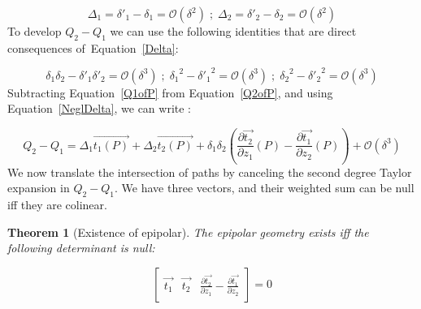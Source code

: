 \documentclass{ipol}
\newcommand{\BigV}[1]{\ensuremath{\overrightarrow{#1}}}
\newcommand{\TanO}[1]{\BigV{t_1#1}}
\newcommand{\TanT}[1]{\BigV{t_2#1}}
\newcommand{\Negl}[1]{\ensuremath{\mathcal{O}(#1)}}
\newcommand{\DerPart}[2]{\frac{\partial #1}{\partial #2}}
\newtheorem{theorem}{Theorem}
\begin{document}
\begin{equation}
   \Delta_1 =   \delta'_1 -\delta_1 = \Negl{\delta^2}  \; ; \; \Delta_2 =   \delta'_2 -\delta_2 = \Negl{\delta^2}
   \label{Delta}
\end{equation}
%
To develop $ Q_2 -Q_1$ we can use the following identities  that are direct consequences of~Equation~\eqref{Delta}:

\begin{equation}
   \delta_1  \delta_2 -  \delta'_1  \delta'_2  = \Negl{\delta^3} \;;\;
   {\delta_1}^2 - {\delta'_1}^2 =  \Negl{\delta^3} \;;\;
   {\delta_2}^2 - {\delta'_2}^2 =  \Negl{\delta^3} 
   \label{NeglDelta}
\end{equation}
%
Subtracting Equation~\eqref{Q1ofP} from Equation~\eqref{Q2ofP}, and using Equation~\eqref{NeglDelta}, we can write :

\begin{equation}
    Q_2 -Q_1 =   \Delta_1 \TanO{(P)} +   \Delta_2 \TanT{(P)}  
               + \delta_1  \delta_2(\DerPart { \TanT{}}{z_1}(P)  -\DerPart { \TanO{}}{z_2}(P) )
               + \Negl{\delta^3}
\end{equation}
%
We now translate the intersection of paths by canceling the second degree Taylor expansion in $Q_2 -Q_1$. We have three vectors, and their weighted sum can be null iff they are colinear.

\begin{theorem}[Existence of epipolar]
The epipolar geometry exists iff the following determinant is null:

\begin{equation}
\left[ \begin{array}{c|c|c}
\TanO{} & \TanT{}  & \DerPart { \TanT{}}{z_1}  -\DerPart { \TanO{}}{z_2}  
\end{array} \right]  
=0
\end{equation}

\end{theorem}
\end{document}

